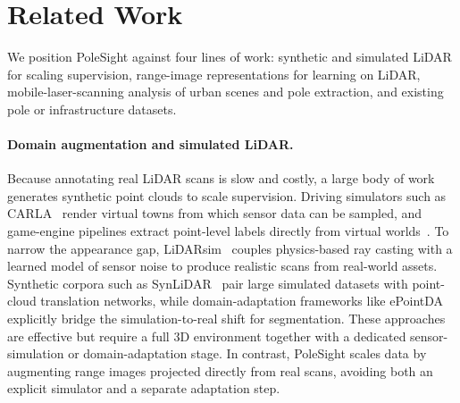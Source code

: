 
\section{Related Work}
\label{sec:related}

We position PoleSight against four lines of work: synthetic and simulated
LiDAR for scaling supervision, range-image representations for learning on
LiDAR, mobile-laser-scanning analysis of urban scenes and pole extraction,
and existing pole or infrastructure datasets.

\paragraph{Domain augmentation and simulated LiDAR.}
Because annotating real LiDAR scans is slow and costly, a large body of work
generates synthetic point clouds to scale supervision. Driving simulators
such as CARLA~\cite{dosovitskiy2017carla} render virtual towns from which
sensor data can be sampled, and game-engine pipelines extract point-level
labels directly from virtual worlds~\cite{yue2018lidar}. To narrow the
appearance gap, LiDARsim~\cite{manivasagam2020lidarsim} couples physics-based
ray casting with a learned model of sensor noise to produce realistic scans
from real-world assets. Synthetic corpora such as
SynLiDAR~\cite{xiao2022synlidar} pair large simulated datasets with
point-cloud translation networks, while domain-adaptation frameworks like
ePointDA~\cite{zhao2021epointda} explicitly bridge the simulation-to-real
shift for segmentation. These approaches are effective but require a full 3D
environment together with a dedicated sensor-simulation or domain-adaptation
stage. In contrast, PoleSight scales data by augmenting range images
projected directly from real scans, avoiding both an explicit simulator and a
separate adaptation step.

